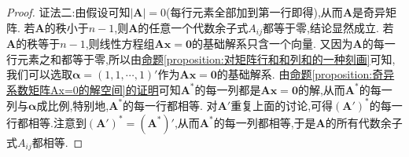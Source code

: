 \documentclass[../../main.tex]{subfiles}%
\begin{document}
\begin{proof}
{\color{blue}证法二:}由假设可知$\left| \boldsymbol{A} \right|=0$(每行元素全部加到第一行即得),从而\(\boldsymbol{A}\)是奇异矩阵. 若\(\boldsymbol{A}\)的秩小于\(n - 1\),则\(\boldsymbol{A}\)的任意一个代数余子式\(A_{ij}\)都等于零,结论显然成立. 若\(\boldsymbol{A}\)的秩等于\(n - 1\),则线性方程组\(\boldsymbol{A}\boldsymbol{x}=\boldsymbol{0}\)的基础解系只含一个向量. 又因为\(\boldsymbol{A}\)的每一行元素之和都等于零,所以由\hyperref[proposition:对矩阵行和和列和的一种刻画]{命题\ref{proposition:对矩阵行和和列和的一种刻画}}可知,我们可以选取\(\boldsymbol{\alpha}=(1,1,\cdots,1)'\)作为\(\boldsymbol{A}\boldsymbol{x}=\boldsymbol{0}\)的基础解系. 由\hyperref[proposition:奇异系数矩阵Ax=0的解空间]{命题\ref{proposition:奇异系数矩阵Ax=0的解空间}的证明}可知\(\boldsymbol{A}^*\)的每一列都是$\boldsymbol{A}\boldsymbol{x}=\boldsymbol{0}$的解,从而\(\boldsymbol{A}^*\)的每一列与\(\boldsymbol{\alpha}\)成比例,特别地,\(\boldsymbol{A}^*\)的每一行都相等. 对\(\boldsymbol{A}'\)重复上面的讨论,可得\((\boldsymbol{A}')^*\)的每一行都相等.注意到\((\boldsymbol{A}')^*=(\boldsymbol{A}^*)'\),从而\(\boldsymbol{A}^*\)的每一列都相等,于是\(\boldsymbol{A}\)的所有代数余子式\(A_{ij}\)都相等.
\end{proof}
\end{document}
